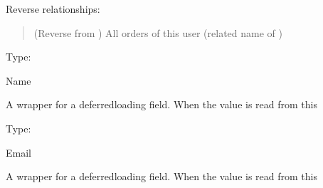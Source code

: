 \documentclass[letterpaper,10pt,russian]{sphinxmanual}
\begin{document}
\begin{fulllineitems}
\begin{quote}
\begin{description}
\begin{itemize}
\end{itemize}

\end{description}\end{quote}

\sphinxAtStartPar
Reverse relationships:
\begin{quote}\begin{description}
\sphinxAtStartPar
{} (Reverse  from {\hyperref[\detokenize{myapp:polls.models.Order}]{}}) \textendash{} All orders of this user (related name of {\hyperref[\detokenize{myapp:polls.models.Order.user}]{}})

\end{description}\end{quote}

\begin{fulllineitems}
\label{\detokenize{myapp:polls.models.User.name}}
\pysigstartsignatures
\pysigline
{}
\pysigstopsignatures
\sphinxAtStartPar
Type: 

\sphinxAtStartPar
Name

\sphinxAtStartPar
A wrapper for a deferred\sphinxhyphen{}loading field. When the value is read from this

\end{fulllineitems}


\begin{fulllineitems}
\label{\detokenize{myapp:polls.models.User.email}}
\pysigstartsignatures
\pysigline
{}
\pysigstopsignatures
\sphinxAtStartPar
Type: 

\sphinxAtStartPar
Email

\sphinxAtStartPar
A wrapper for a deferred\sphinxhyphen{}loading field. When the value is read from this


\end{fulllineitems}
\end{fulllineitems}
\end{document}

